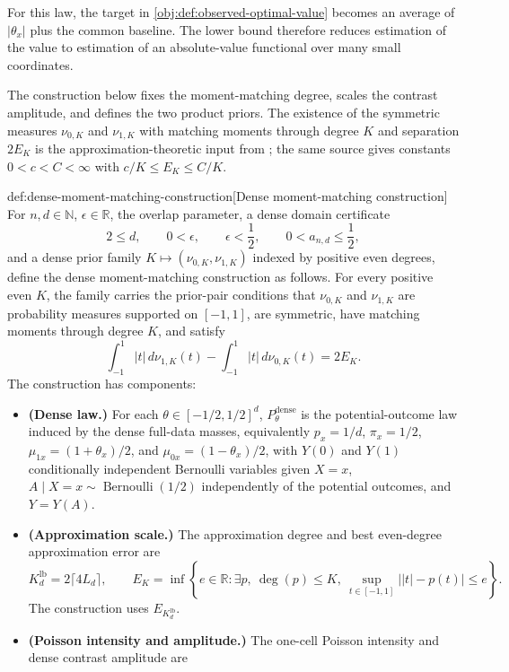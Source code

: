 \documentclass[11pt]{article}
\begin{document}
For this law, the target in \cref{obj:def:observed-optimal-value} becomes an average of \(|\theta_x|\) plus the common baseline. The lower bound therefore reduces estimation of the value to estimation of an absolute-value functional over many small coordinates.

The construction below fixes the moment-matching degree, scales the contrast amplitude, and defines the two product priors. The existence of the symmetric measures \(\nu_{0,K}\) and \(\nu_{1,K}\) with matching moments through degree \(K\) and separation \(2E_K\) is the approximation-theoretic input from \citet[Lemma 1 and Section 3.1]{CaiLow2011L1}; the same source gives constants \(0<c<C<\infty\) with \(c/K\le E_K\le C/K\).

\begin{definitionv}{def:dense-moment-matching-construction}[Dense moment-matching construction]
For \(n,d\in\mathbb N\), \(\epsilon\in\mathbb R\), the overlap parameter, a dense domain certificate
\[
2\le d,\qquad
0<\epsilon,\qquad
\epsilon<\frac12,\qquad
0<a_{n,d}\le \frac12,
\]
and a dense prior family \(K\mapsto(\nu_{0,K},\nu_{1,K})\) indexed by positive even degrees, define the dense moment-matching construction as follows.  For every positive even \(K\), the family carries the prior-pair conditions that \(\nu_{0,K}\) and \(\nu_{1,K}\) are probability measures supported on \([-1,1]\), are symmetric, have matching moments through degree \(K\), and satisfy
\[
\int_{-1}^1 |t|\,d\nu_{1,K}(t)
-
\int_{-1}^1 |t|\,d\nu_{0,K}(t)
=
2E_K .
\]
The construction has components:
\begin{itemize}
\item \textbf{(Dense law.)} For each \(\theta\in[-1/2,1/2]^d\), \(P_\theta^{\mathrm{dense}}\) is the potential-outcome law induced by the dense full-data masses, equivalently \(p_x=1/d\), \(\pi_x=1/2\), \(\mu_{1x}=(1+\theta_x)/2\), and \(\mu_{0x}=(1-\theta_x)/2\), with \(Y(0)\) and \(Y(1)\) conditionally independent Bernoulli variables given \(X=x\), \(A\mid X=x\sim\operatorname{Bernoulli}(1/2)\) independently of the potential outcomes, and \(Y=Y(A)\).
\item \textbf{(Approximation scale.)} The approximation degree and best even-degree approximation error are
\[
K_d^{\mathrm{lb}}=2\lceil4L_d\rceil,
\qquad
E_K=\inf\left\{e\in\mathbb R:\exists p,\ \deg(p)\le K,\ 
\sup_{t\in[-1,1]}\bigl||t|-p(t)\bigr|\le e\right\}.
\]
The construction uses \(E_{K_d^{\mathrm{lb}}}\).
\item \textbf{(Poisson intensity and amplitude.)} The one-cell Poisson intensity and dense contrast amplitude are

\end{itemize}
\end{definitionv}
\end{document}
